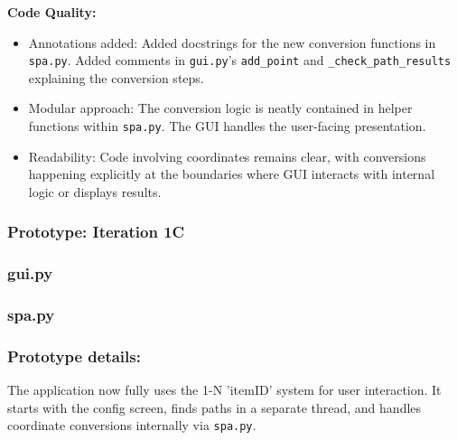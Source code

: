 \textbf{Code Quality:}
\begin{itemize}
	\item Annotations added: Added docstrings for the new conversion functions in \verb|spa.py|. Added comments in \verb|gui.py|'s \verb|add_point| and \verb|_check_path_results| explaining the conversion steps.
	\item Modular approach: The conversion logic is neatly contained in helper functions within \verb|spa.py|. The GUI handles the user-facing presentation.
	\item Readability: Code involving coordinates remains clear, with conversions happening explicitly at the boundaries where GUI interacts with internal logic or displays results.
\end{itemize}

\newpage
\subsubsection*{Prototype: Iteration 1C}
\subsubsection{gui.py}

\subsubsection{spa.py}



\newpage

\subsubsection{Prototype details:}
The application now fully uses the 1-N 'itemID' system for user interaction. It starts with the config screen, finds paths in a separate thread, and handles coordinate conversions internally via \verb*|spa.py|.

